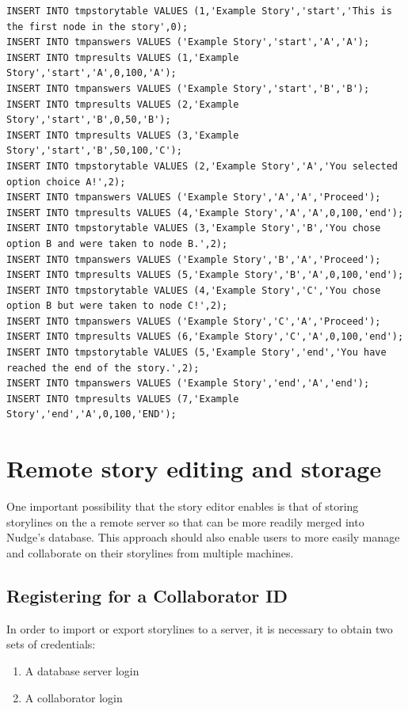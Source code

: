 \documentclass[12pt,letterpaper]{article}
\begin{document}
\begin{lstlisting}[breaklines=true, caption=Set of generated SQL statements.]
INSERT INTO tmpstorytable VALUES (1,'Example Story','start','This is the first node in the story',0);
INSERT INTO tmpanswers VALUES ('Example Story','start','A','A');
INSERT INTO tmpresults VALUES (1,'Example Story','start','A',0,100,'A');
INSERT INTO tmpanswers VALUES ('Example Story','start','B','B');
INSERT INTO tmpresults VALUES (2,'Example Story','start','B',0,50,'B');
INSERT INTO tmpresults VALUES (3,'Example Story','start','B',50,100,'C');
INSERT INTO tmpstorytable VALUES (2,'Example Story','A','You selected option choice A!',2);
INSERT INTO tmpanswers VALUES ('Example Story','A','A','Proceed');
INSERT INTO tmpresults VALUES (4,'Example Story','A','A',0,100,'end');
INSERT INTO tmpstorytable VALUES (3,'Example Story','B','You chose option B and were taken to node B.',2);
INSERT INTO tmpanswers VALUES ('Example Story','B','A','Proceed');
INSERT INTO tmpresults VALUES (5,'Example Story','B','A',0,100,'end');
INSERT INTO tmpstorytable VALUES (4,'Example Story','C','You chose option B but were taken to node C!',2);
INSERT INTO tmpanswers VALUES ('Example Story','C','A','Proceed');
INSERT INTO tmpresults VALUES (6,'Example Story','C','A',0,100,'end');
INSERT INTO tmpstorytable VALUES (5,'Example Story','end','You have reached the end of the story.',2);
INSERT INTO tmpanswers VALUES ('Example Story','end','A','end');
INSERT INTO tmpresults VALUES (7,'Example Story','end','A',0,100,'END');
\end{lstlisting}

\section{Remote story editing and storage}

One important possibility that the story editor enables is that of storing storylines on 
the a remote server so that can be more readily merged into Nudge's database. This approach
should also enable users to more easily manage and collaborate on their storylines from multiple
machines.

\subsection{Registering for a Collaborator ID}
In order to import or export storylines to a server, it is necessary to obtain two sets of credentials:
    
\begin{enumerate}
\item A database server login
\item A collaborator login
\end{enumerate}
\end{document}
